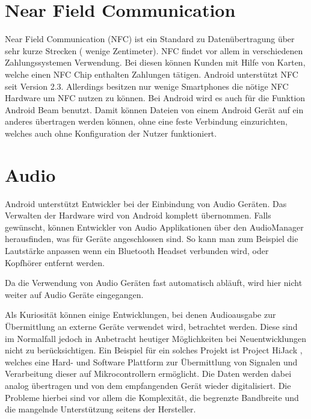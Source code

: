 \documentclass[12pt,journal,compsoc]{IEEEtran}
\begin{document}
\section{Near Field Communication}
Near Field Communication (NFC) ist ein Standard zu Datenübertragung über sehr kurze Strecken ( wenige Zentimeter). 
NFC findet vor allem in verschiedenen Zahlungssystemen Verwendung.
Bei diesen können Kunden mit Hilfe von Karten, welche einen NFC Chip enthalten Zahlungen tätigen.
Android unterstützt NFC seit Version 2.3. Allerdings besitzen nur wenige Smartphones die nötige NFC Hardware um NFC nutzen zu können.
Bei Android wird es auch für die Funktion Android Beam benutzt. 
Damit können Dateien von einem Android Gerät auf ein anderes übertragen werden können, ohne eine feste Verbindung einzurichten, welches auch ohne Konfiguration der Nutzer funktioniert.

\section{Audio}
Android unterstützt Entwickler bei der Einbindung von Audio Geräten. Das Verwalten der Hardware wird von Android komplett übernommen.
Falls gewünscht, können Entwickler von Audio Applikationen über den AudioManager herausfinden, was für Geräte angeschlossen sind. So kann man zum Beispiel die Lautstärke anpassen wenn ein Bluetooth Headset verbunden wird, oder Kopfhörer entfernt werden.

Da die Verwendung von Audio Geräten fast automatisch abläuft, wird hier nicht weiter auf Audio Geräte eingegangen.

Als Kuriosität können einige Entwicklungen, bei denen Audioausgabe zur Übermittlung an externe Geräte verwendet wird, betrachtet werden.
Diese sind im Normalfall jedoch in Anbetracht heutiger Möglichkeiten bei Neuentwicklungen nicht zu berücksichtigen.  
Ein Beispiel für ein solches Projekt ist Project HiJack \cite{hijack} , welches eine Hard- und Software Plattform zur Übermittlung von Signalen und Verarbeitung dieser auf Mikrocontrollern ermöglicht. 
Die Daten werden dabei analog übertragen und von dem empfangenden Gerät wieder digitalisiert.
Die Probleme hierbei sind vor allem die Komplexität, die begrenzte Bandbreite und die mangelnde Unterstützung seitens der Hersteller.
\end{document}
